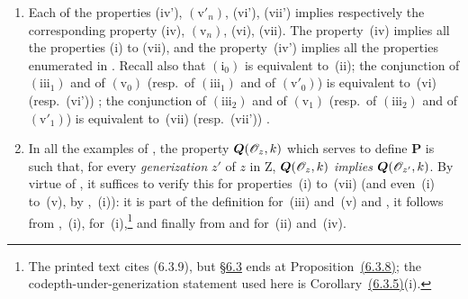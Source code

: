 \begin{remarks}[7.3.9]
\label{IV.7.3.9}
\begin{enumerate}[label=(\roman*)]
  \item Each of the properties (iv'), $(\mathrm{v}'_n)$, (vi'), (vii') implies respectively the corresponding property (iv), $(\mathrm{v}_n)$, (vi), (vii).
  The property~(iv) implies all the properties (i) to (vii), and the property~(iv') implies all the properties enumerated in .
  Recall also that $(\mathrm{i}_0)$ is equivalent to~(ii); the conjunction of $(\mathrm{iii}_1)$ and of $(\mathrm{v}_0)$ (resp.~of $(\mathrm{iii}_1)$ and of $(\mathrm{v}'_0)$) is equivalent to~(vi) (resp.~(vi')) ; the conjunction of $(\mathrm{iii}_2)$ and of $(\mathrm{v}_1)$ (resp.~of $(\mathrm{iii}_2)$ and of $(\mathrm{v}'_1)$) is equivalent to~(vii) (resp.~(vii')) .

  \item In all the examples of , the property $\boldsymbol{Q}(\mathscr{O}_z,k)$ which serves to define $\boldsymbol{P}$ is such that, for every \emph{generization} $z'$ of $z$ in $\mathrm{Z}$, $\boldsymbol{Q}(\mathscr{O}_z,k)$ \emph{implies} $\boldsymbol{Q}(\mathscr{O}_{z'},k)$.
  By virtue of , it suffices to verify this for properties~(i) to~(vii) (and even~(i) to~(v), by ,~(i)): it is part of the definition for~(iii) and~(v)  and , it follows from ,~(i), for~(i),\footnote{The printed text cites (6.3.9), but {\hyperref[subsection:IV.6.3]{\S6.3}} ends at Proposition~{\hyperref[IV.6.3.8]{(6.3.8)}}; the codepth-under-generization statement used here is Corollary~{\hyperref[IV.6.3.5]{(6.3.5)}}(i).} and finally from  and  for~(ii) and~(iv).
\end{enumerate}
\end{remarks}


